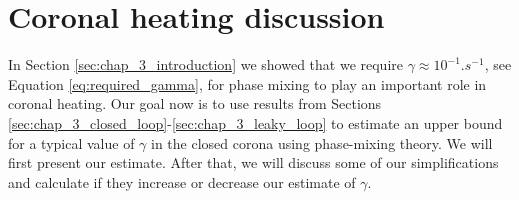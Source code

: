 \section{Coronal heating discussion}
\label{sec:chap_3_coronal_heating}

In Section \ref{sec:chap_3_introduction} we showed that we require $\gamma\approx10^{-1}\si{.s^{-1}}$, see Equation \eqref{eq:required_gamma}, for phase mixing to play an important role in coronal heating. Our goal now is to use results from Sections \ref{sec:chap_3_closed_loop}-\ref{sec:chap_3_leaky_loop} to estimate an upper bound for a typical value of $\gamma$ in the closed corona using phase-mixing theory. We will first present our estimate. After that, we will discuss some of our simplifications and calculate if they increase or decrease our estimate of $\gamma$.

